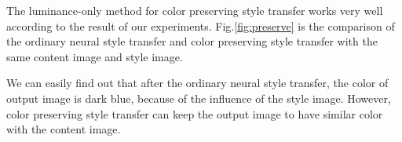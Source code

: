\documentclass[runningheads]{llncs}
\begin{document}
The luminance-only method for color preserving style transfer works very well according to the result of our experiments. Fig.\ref{fig:preserve} is the comparison of the ordinary neural style transfer and color preserving style transfer with the same content image and style image.

We can easily find out that after the ordinary neural style transfer, the color of output image is dark blue, because of the influence of the style image. However, color preserving style transfer can keep the output image to have similar color with the content image.
\end{document}
